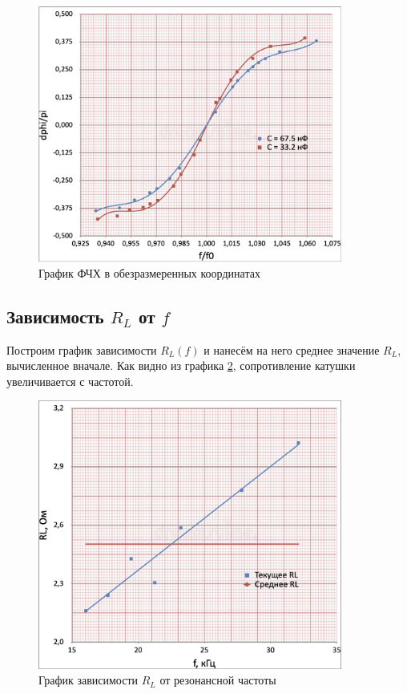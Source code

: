 \documentclass[12pt,a4paper]{article}
\begin{document}
\begin{figure}[H]
	\centering
	\includegraphics[width=10cm]{"src/apc1.png"}
	\caption{График ФЧХ в обезразмеренных координатах}
	\label{fig:apc1}
\end{figure}

\subsection*{Зависимость $R_L$ от $f$}

Построим график зависимости $R_L\left(f\right)$ и нанесём на него среднее значение $R_L$, вычисленное вначале. Как видно из графика \ref{fig:rl}, сопротивление катушки увеличивается с частотой.

\begin{figure}[H]
	\centering
	\includegraphics[width=10cm]{"src/RL.png"}
	\caption{График зависимости $R_L$ от резонансной частоты}
	\label{fig:rl}
\end{figure}
\end{document}
